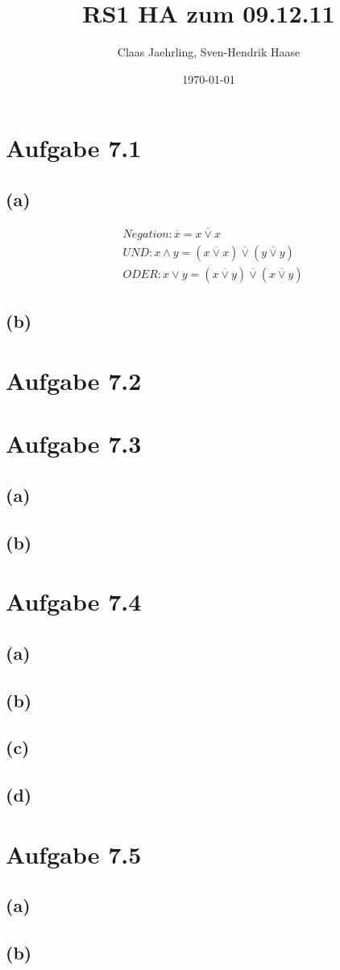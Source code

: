 \documentclass[12pt]{article}
\author{Claas Jaehrling, Sven-Hendrik Haase}
\title{RS1 HA zum 09.12.11}
\date{\today}
\begin{document}
\setcounter{secnumdepth}{0}
\maketitle

\section{Aufgabe 7.1}
\subsection{(a)}
\begin{align}
&Negation: \overline x = x \overline \lor x\\
&UND: x \land y = (x \overline \lor x) \overline \lor (y \overline \lor y)\\
&ODER: x \lor y = (x \overline \lor y) \overline \lor (x \overline \lor y)
\end{align}
\subsection{(b)}



\section{Aufgabe 7.2}


\section{Aufgabe 7.3}
\subsection{(a)}

\subsection{(b)}

\section{Aufgabe 7.4}

\subsection{(a)}
\subsection{(b)}
\subsection{(c)}
\subsection{(d)}


\section{Aufgabe 7.5}

\subsection{(a)}
\subsection{(b)}
\end{document}
